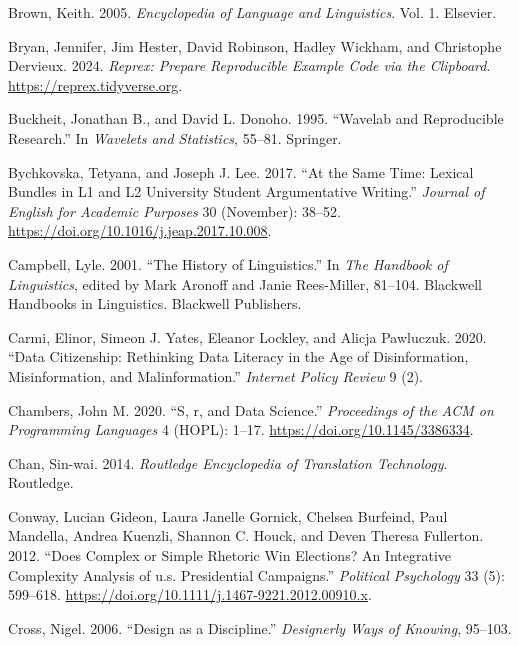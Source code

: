 \documentclass[
  letterpaper,
  DIV=11,
  numbers=noendperiod]{scrreprt}
\newlength{\cslhangindent}
\newenvironment{CSLReferences}[2] %
 {\begin{list}{}{%
  \setlength{\itemindent}{0pt}
  \setlength{\leftmargin}{0pt}
  \setlength{\parsep}{0pt}
  \ifodd #1
   \setlength{\leftmargin}{\cslhangindent}
   \setlength{\itemindent}{-1\cslhangindent}
  \fi
  \setlength{\itemsep}{#2\baselineskip}}}
 {\end{list}}
\theoremstyle{definition}
\theoremstyle{remark}
\begin{document}
\begin{CSLReferences}{1}{0}
Brown, Keith. 2005. \emph{Encyclopedia of Language and Linguistics}.
Vol. 1. Elsevier.

Bryan, Jennifer, Jim Hester, David Robinson, Hadley Wickham, and
Christophe Dervieux. 2024. \emph{Reprex: Prepare Reproducible Example
Code via the Clipboard}. \url{https://reprex.tidyverse.org}.

Buckheit, Jonathan B., and David L. Donoho. 1995. {``Wavelab and
Reproducible Research.''} In \emph{Wavelets and Statistics}, 55--81.
Springer.

Bychkovska, Tetyana, and Joseph J. Lee. 2017. {``At the Same Time:
Lexical Bundles in L1 and L2 University Student Argumentative
Writing.''} \emph{Journal of English for Academic Purposes} 30
(November): 38--52. \url{https://doi.org/10.1016/j.jeap.2017.10.008}.

Campbell, Lyle. 2001. {``The History of Linguistics.''} In \emph{The
Handbook of Linguistics}, edited by Mark Aronoff and Janie Rees-Miller,
81--104. Blackwell Handbooks in Linguistics. Blackwell Publishers.

Carmi, Elinor, Simeon J. Yates, Eleanor Lockley, and Alicja Pawluczuk.
2020. {``Data Citizenship: Rethinking Data Literacy in the Age of
Disinformation, Misinformation, and Malinformation.''} \emph{Internet
Policy Review} 9 (2).

Chambers, John M. 2020. {``S, r, and Data Science.''} \emph{Proceedings
of the ACM on Programming Languages} 4 (HOPL): 1--17.
\url{https://doi.org/10.1145/3386334}.

Chan, Sin-wai. 2014. \emph{Routledge Encyclopedia of Translation
Technology}. Routledge.

Conway, Lucian Gideon, Laura Janelle Gornick, Chelsea Burfeind, Paul
Mandella, Andrea Kuenzli, Shannon C. Houck, and Deven Theresa Fullerton.
2012. {``Does Complex or Simple Rhetoric Win Elections? An Integrative
Complexity Analysis of u.s. Presidential Campaigns.''} \emph{Political
Psychology} 33 (5): 599--618.
\url{https://doi.org/10.1111/j.1467-9221.2012.00910.x}.

Cross, Nigel. 2006. {``Design as a Discipline.''} \emph{Designerly Ways
of Knowing}, 95--103.


\end{CSLReferences}
\end{document}

